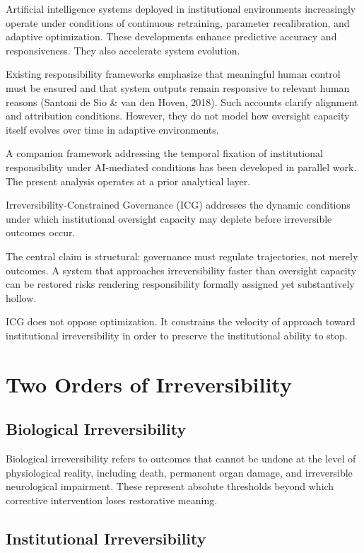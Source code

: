 \documentclass[12pt]{article}
\begin{document}
Artificial intelligence systems deployed in institutional environments increasingly operate
under conditions of continuous retraining, parameter recalibration, and adaptive optimization.
These developments enhance predictive accuracy and responsiveness. They also accelerate system
evolution.

Existing responsibility frameworks emphasize that meaningful human control must be ensured
and that system outputs remain responsive to relevant human reasons
(Santoni de Sio \& van den Hoven, 2018).
Such accounts clarify alignment and attribution conditions. However, they do not model how
oversight capacity itself evolves over time in adaptive environments.

A companion framework addressing the temporal fixation of institutional responsibility under
AI-mediated conditions has been developed in parallel work. The present analysis operates
at a prior analytical layer.

Irreversibility-Constrained Governance (ICG) addresses the dynamic conditions under which
institutional oversight capacity may deplete before irreversible outcomes occur.

The central claim is structural: governance must regulate trajectories, not merely outcomes.
A system that approaches irreversibility faster than oversight capacity can be restored risks
rendering responsibility formally assigned yet substantively hollow.

ICG does not oppose optimization. It constrains the velocity of approach toward institutional
irreversibility in order to preserve the institutional ability to stop.

\section{Two Orders of Irreversibility}

\subsection{Biological Irreversibility}

Biological irreversibility refers to outcomes that cannot be undone at the level of
physiological reality, including death, permanent organ damage, and irreversible neurological
impairment. These represent absolute thresholds beyond which corrective intervention
loses restorative meaning.

\subsection{Institutional Irreversibility}
\end{document}

